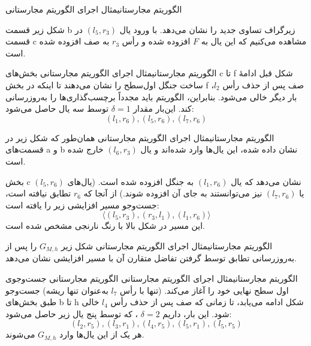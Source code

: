 \begin{itemframe-s}{الگوریتم مجارستانی}{مثال اجرای الگوریتم مجارستانی}
\itm

شکل زیر قسمت b زیرگراف تساوی جدید را نشان می‌دهد.
با ورود یال
$(l_5, r_3)$
در قسمت c مشاهده می‌کنیم که این یال به $F$ افزوده شده و رأس
$r_3$
به صف افزوده شده است.

\end{itemframe-s}


\begin{itemframe-s}{الگوریتم مجارستانی}{مثال اجرای الگوریتم مجارستانی}
\itm
بخش‌های c تا f شکل قبل ادامهٔ ساخت جنگل اول‌سطح را نشان می‌دهند تا اینکه در بخش f صف پس از حذف رأس
$l_2$،
بار دیگر خالی می‌شود.
\itm
بنابراین، الگوریتم باید مجدداً برچسب‌گذاری‌ها را به‌روزرسانی کند. این‌بار مقدار
$\delta = 1$
توسط سه یال حاصل می‌شود:
$$
(l_1, r_6), (l_5, r_6),  (l_7, r_6)
$$
\end{itemframe-s}


\begin{itemframe-s}{الگوریتم مجارستانی}{مثال اجرای الگوریتم مجارستانی}
\itm
همان‌طور که شکل زیر در قسمت‌های a و b نشان داده شده، این یال‌ها وارد شده‌اند و یال
$(l_6, r_3)$
خارج شده است.

بخش c نشان می‌دهد که یال $(l_1, r_6)$ به جنگل افزوده شده است. (یال‌های $(l_5, r_6)$ یا $(l_7, r_6)$ نیز می‌توانستند به جای آن افزوده شوند.)
\itm
از آنجا که
$r_6$
تطابق نیافته است، جست‌وجو مسیر افزایشی زیر را یافته است:
$$
\langle (l_5, r_3), (r_3, l_1), (l_1, r_6) \rangle
$$
این مسیر در شکل بالا با رنگ نارنجی مشخص شده است.

\end{itemframe-s}


\begin{itemframe-s}{الگوریتم مجارستانی}{مثال اجرای الگوریتم مجارستانی}
\itm
شکل زیر $G_{M,h}$ را پس از به‌روزرسانی تطابق توسط گرفتن تفاضل متقارن آن با مسیر افزایشی  نشان می‌دهد.

\end{itemframe-s}


\begin{itemframe-s}{الگوریتم مجارستانی}{مثال اجرای الگوریتم مجارستانی}
\itm
الگوریتم مجارستانی جست‌وجوی اول سطح نهایی خود را آغاز می‌کند. (تنها با رأس
$l_7$
به‌عنوان تنها ریشه) جست‌وجو طبق بخش‌های b تا h شکل ادامه می‌یابد، تا زمانی که صف پس از حذف رأس
$l_4$
خالی شود.
\itm
این بار، داریم
$\delta = 2$
، که توسط پنج یال زیر حاصل می‌شود:
$$
(l_2, r_5),  (l_3, r_1),  (l_4, r_5),  (l_5, r_1),  (l_5, r_5)
$$
هر یک از این یال‌ها وارد $G_{M,h}$ می‌شوند.


\end{itemframe-s}


